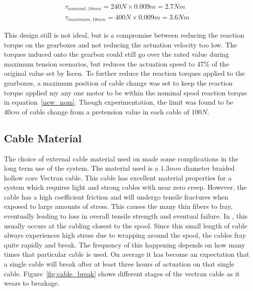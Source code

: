 \begin{appendices}
\begin{align}
\tau_{nominal, 18mm} = 240N \times 0.009m = 2.7Nm \label{new_nom} \\
\tau_{maximum, 18mm} = 400N \times 0.009m = 3.6Nm \label{new_max}
\end{align}

This design still is not ideal, but is a compromise between reducing the reaction torque on the gearboxes and not reducing the actuation velocity too low.
The torques induced onto the gearbox could still go over the rated value during maximum tension scenarios, but reduces the actuation speed to \(47\%\) of the original value set by Iscen.
To further reduce the reaction torques applied to the gearboxes, a maximum position of cable change was set to keep the reaction torque applied my any one motor to be within the nominal spool reaction torque in equation~\ref{new_nom}.
Though experimentation, the limit was found to be \(40cm\) of cable change from a pretension value in each cable of \(100N\).

\subsection{Cable Material}
The choice of external cable material used on \SB{} made some complications in the long term use of the system.
The material used is a \(1.3mm\) diameter braided hollow core Vectran cable.
This cable has excellent material properties for a system which requires light and strong cables with near zero creep.
However, the cable has a high coefficient friction and will undergo tensile fractures when exposed to large amounts of stress.
This causes the many thin fibers to fray, eventually leading to loss in overall tensile strength and eventual failure. 
In \SB{}, this usually occurs at the cabling closest to the spool. 
Since this small length of cable always experiences high stress due to wrapping around the spool, the cables fray quite rapidly and break.
The frequency of this happening depends on how many times that particular cable is used.
On average it has become an expectation that a single cable will break after at least three hours of actuation on that single cable. 
Figure~\ref{fig:cable_break} shows different stages of the vectran cable as it wears to breakage.


\end{appendices}
